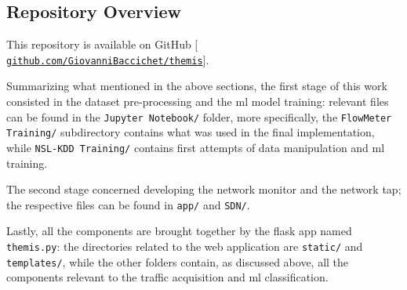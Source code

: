 




\newpage

\subsection{Repository Overview}
\label{subsec:repository}

This repository is available on GitHub [{\fontsize{7}{7}\faExternalLink*[regular]} \href{https://github.com/GiovanniBaccichet/themis/}{\texttt{github.com/GiovanniBaccichet/themis}}].
\par Summarizing what mentioned in the above sections, the first stage of this work consisted in the dataset pre-processing and the \gls{ml} model training: relevant files can be found in the \texttt{Jupyter Notebook/} folder, more specifically, the \texttt{FlowMeter Training/} subdirectory contains what was used in the final implementation, while \texttt{NSL-KDD Training/} contains first attempts of data manipulation and \gls{ml} training.
\par The second stage concerned developing the network monitor and the network \gls{tap}; the respective files can be found in \texttt{app/} and \texttt{SDN/}.
\par Lastly, all the components are brought together by the flask app named \texttt{themis.py}: the directories related to the web application are \texttt{static/} and \texttt{templates/}, while the other folders contain, as discussed above, all the components relevant to the traffic acquisition and \gls{ml} classification. 

